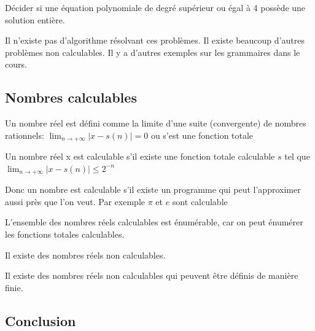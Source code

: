 \begin{mydef} Décider si une équation 
	polynomiale de degré supérieur ou égal à 4 possède une solution entière.
\end{mydef}

Il n'existe pas d'algorithme résolvant ces problèmes. Il existe beaucoup
d'autres problèmes non calculables. Il y a d'autres exemples sur les grammaires dans le cours.

\subsection{Nombres calculables}
\label{sub:nombres_calculables}

\begin{mydef}
	Un nombre réel est défini comme la limite d'une suite (convergente) de 
	nombres rationnels: $\lim_{n \rightarrow +\infty} |x-s(n)| = 0 $ ou s’est 
	une fonction totale
\end{mydef}

\begin{mydef}
	Un nombre réel x est calculable s’il existe une fonction totale 
	calculable $s$ tel que $\lim_{n \rightarrow +\infty} |x-s(n)| \leq 2^{-n}$
\end{mydef}

\begin{myrem}
	Donc un nombre est calculable s'il existe un programme qui peut 
	l'approximer aussi près que l'on veut. Par exemple $\pi$ et $e$ sont 
	calculable
\end{myrem}

\begin{myprop}
	L'ensemble des nombres réels calculables est énumérable, car on peut énumérer les 
	fonctions totales calculables.	
\end{myprop}

\begin{myprop}
	Il existe des nombres réels non calculables.
\end{myprop}

\begin{myprop}
	Il existe des nombres réels non calculables qui peuvent être définis de 
	manière finie.
\end{myprop}


\subsection{Conclusion}

